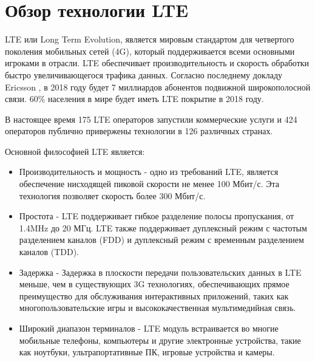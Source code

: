 \section{Обзор технологии LTE} \label{sect1_2}

LTE или Long Term Evolution, является мировым стандартом для четвертого поколения мобильных сетей (4G), который поддерживается всеми основными игроками в отрасли. LTE обеспечивает производительность и скорость обработки быстро увеличивающегося трафика данных. Согласно последнему докладу Ericsson \cite{ericsson}, в 2018 году будет 7 миллиардов абонентов подвижной широкополосной связи. 60\% населения в мире будет иметь LTE покрытие в 2018 году.

В настоящее время 175 LTE операторов запустили коммерческие услуги и 424 операторов публично привержены технологии в 126 различных странах.

Основной философией LTE является:
\begin{itemize}
\item Производительность и мощность - одно из требований LTE, является обеспечение нисходящей пиковой скорости не менее 100 Мбит/с. Эта технология позволяет скорость более 300 Мбит/с.

\item Простота - LTE поддерживает гибкое разделение полосы пропускания, от 1.4MHz до 20 МГц. LTE также поддерживает дуплексный режим с частотым разделением каналов (FDD) и дуплексный режим с временным разделением каналов (TDD).

\item Задержка - Задержка в плоскости передачи пользовательских данных в LTE меньше, чем в существующих 3G технологиях, обеспечивающих прямое преимущество для обслуживания интерактивных приложений, таких как многопользовательские игры и высококачественная мультимедийная связь.

\item Широкий диапазон терминалов - LTE модуль встраивается во многие мобильные телефоны, компьютеры и другие электронные устройства, такие как ноутбуки, ультрапортативные ПК, игровые устройства и камеры.
\end{itemize}

